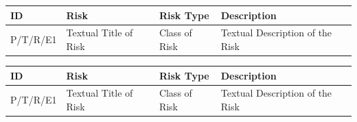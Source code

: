 \documentclass[12pt]{article}  %
\theoremstyle{definition}
\theoremstyle{remark}
\begin{document}
\begin{tabularx}{1.1\textwidth} {
	|  >{\center\arraybackslash}X
	| >{\center\arraybackslash}X
	| >{\center\arraybackslash}X
	| >{\center\arraybackslash} X | }
	\hline
	ID & Risk & Risk Type & Description \\
	\hline
	P/T/R/E1 & Textual Title of Risk & Class of Risk & Textual Description of the Risk \\
	\hline
\end{tabularx}

\begin{tabularx}{1.1\textwidth} {
	|  >{\center\arraybackslash}X
	| >{\center\arraybackslash}X
	| >{\center\arraybackslash}X
	| >{\center\arraybackslash} X | }
	\hline
	ID & Risk & Risk Type & Description \\
	\hline
	P/T/R/E1 & Textual Title of Risk & Class of Risk & Textual Description of the Risk \\
	\hline
\end{tabularx}
\end{document}
